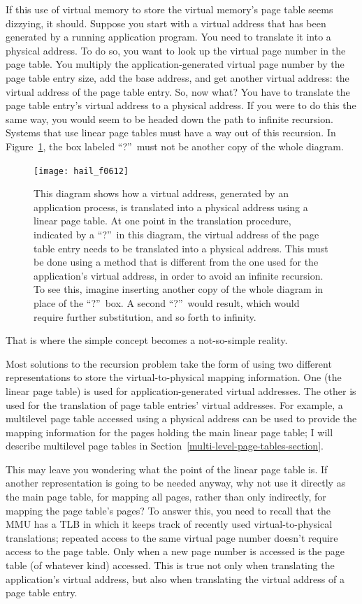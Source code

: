 If this use of virtual memory to store the virtual memory's page table
seems dizzying, it should.  Suppose you start with a virtual address
that has been generated by a running application program.  You need to
translate it into a physical address.  To do so, you want to look up
the virtual page number in the page table.  You multiply the
application-generated virtual page number by the page table entry
size, add the base address, and get another virtual address: the
virtual address of the page table entry.  So, now what?  You have to
translate the page table entry's virtual address to a physical address.
If you were to do this the same way, you would seem to be headed down
the path to infinite recursion.
Systems that use linear
page tables must have a way out of this recursion. In Figure~\ref{scan-6-7}, the
box labeled ``?''\ must not be another copy of the whole diagram.
\begin{figure}
\centerline{\texttt{[image: hail\_f0612]}}
\caption{This diagram shows how a virtual address, generated by an
  application process, is translated into a physical address using a
  linear page table.  At one point in the translation procedure,
  indicated by a ``?''\ in this diagram, the virtual address of the
  page table entry needs to be translated into a physical address.
  This must be done using a method that is different from the one used for the
  application's virtual address, in order to avoid an infinite
  recursion.  To see this, imagine inserting another copy of the whole diagram in
  place of the ``?''\ box.  A second ``?''\ would result, which would
  require further substitution, and so forth to infinity.}
\label{scan-6-7}
\end{figure}
That is where the
simple concept becomes a not-so-simple reality.

Most solutions to the recursion problem take the form
of using two different representations to store the
virtual-to-physical mapping information.  One (the linear page table)
is used for application-generated virtual addresses.  The other is
used for the translation of page table entries' virtual addresses.
For example, a multilevel page table accessed using a physical address can be used to provide the mapping information for the
pages holding the main linear page table; I will describe multilevel page
tables in Section~\ref{multi-level-page-tables-section}.

This may leave you wondering what the point of the linear page table
is.  If another representation is going to be needed anyway, why not
use it directly as the main page table, for mapping all pages, rather
than only indirectly, for mapping the page table's pages?  To answer
this, you need to recall that the MMU has a TLB in which it keeps track of
recently used virtual-to-physical translations; repeated access to the
same virtual page number doesn't require access to the page table.  Only
when a new page number is accessed is the page table (of whatever
kind) accessed.  This is true not only when translating the
application's virtual address, but also when translating the virtual
address of a page table entry.

